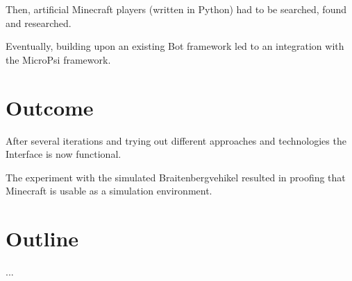 Then, artificial Minecraft players (written in Python) had to be searched, found and researched.

Eventually, building upon an existing Bot framework led to an integration with the MicroPsi framework.

\section{Outcome}
After several iterations and trying out different approaches and technologies the Interface is now functional.

The experiment with the simulated Braitenbergvehikel resulted in proofing that Minecraft is usable as a simulation environment.

\section{Outline}
...